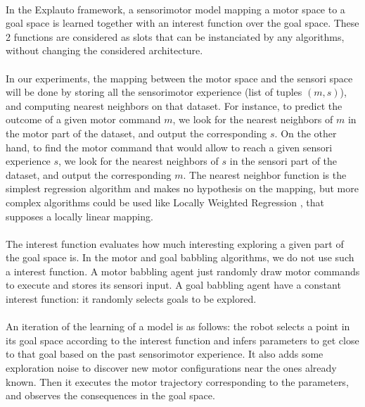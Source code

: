 \documentclass[12pt]{article}
\begin{document}
			\paragraph{}
			In the Explauto framework, a sensorimotor model mapping a motor space to a goal space is learned 
			together with an interest function over the goal space. 
			These 2 functions are considered as slots that can be instanciated by any algorithms, 
			without changing the considered architecture.
			
			\paragraph{}
			In our experiments, the mapping between the motor space and the sensori space will be done by storing all the sensorimotor 
			experience (list of tuples $(m, s)$), and computing nearest neighbors on that dataset.
			For instance, to predict the outcome of a given motor command $m$, we look for the nearest neighbors of $m$ in the motor part of the 
			dataset, and output the corresponding $s$. 
			On the other hand, to find the motor command that would allow to reach a given sensori experience $s$, 
			we look for the nearest neighbors of $s$ in the sensori part of the 
			dataset, and output the corresponding $m$. 
			The nearest neighbor function is the simplest regression algorithm and makes no hypothesis on the mapping, 
			but more complex algorithms could be used like Locally Weighted Regression \cite{lwr}, that supposes a locally linear mapping.
			
			\paragraph{}
			The interest function evaluates how much interesting exploring a given part of the goal space is.
			In the motor and goal babbling algorithms, we do not use such a interest function. 
			A motor babbling agent just randomly draw motor commands to execute and stores its sensori input.
			A goal babbling agent have a constant interest function: it randomly selects goals to be explored.
			
			
			\paragraph{}
			An iteration of the learning of a model is as follows: 
			the robot selects a point in its goal space according to the interest function and infers parameters 
			to get close to that goal based on the past sensorimotor experience.
			It also adds some exploration noise to discover new motor configurations near the ones already known.
			Then it executes the motor trajectory corresponding to the parameters, and observes the consequences in the goal space.	
		
\end{document}
